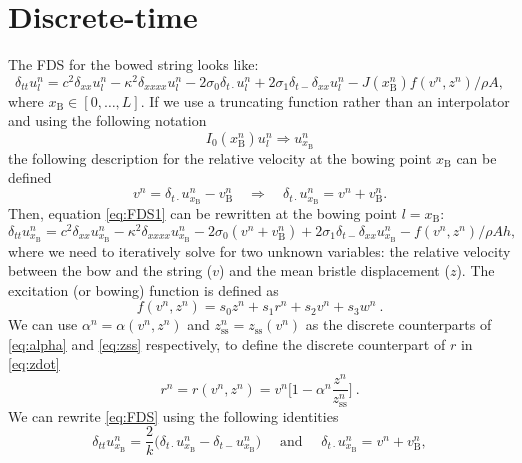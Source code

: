\documentclass{article}
\begin{document}
\section{Discrete-time}
The FDS for the bowed string looks like:
\begin{equation}\label{eq:FDS1}
    \delta_{tt} u_l^n =c^2 \delta_{xx} u_l^n -\kappa^2\delta_{xxxx} u_l^n - 2\sigma_0\delta_{t\cdot} u_l^n
    + 2\sigma_1\delta_{t-}\delta_{xx}u_l^n - J(x_\text{B}^n)f(v^n, z^n)/\rho A,
\end{equation}
where $x_\text{B} \in [0,\hdots, L]$. If we use a truncating function rather than an interpolator and using the following notation
\begin{equation}
    I_0(x_\text{B}^n)u^n_l \Rightarrow u^n_{x_\text{B}}
\end{equation}
the following description for the relative velocity at the bowing point $x_\text{B}$ can be defined
\begin{equation}
    v^n = \delta_{t\cdot}u^n_{x_\text{B}} - v_\text{B}^n \quad \Rightarrow \quad \delta_{t\cdot}u^n_{x_\text{B}} = v^n + v_\text{B}^n.
\end{equation}
Then, equation \eqref{eq:FDS1} can be rewritten at the bowing point $l=x_\text{B}$:
\begin{equation}
\label{eq:FDS}
\delta_{tt} u_{x_\text{B}}^n =c^2 \delta_{xx} u_{x_\text{B}}^n -\kappa^2\delta_{xxxx} u_{x_\text{B}}^n - 2\sigma_0(v^n + v_\text{B}^n)
+ 2\sigma_1\delta_{t-}\delta_{xx}u_{x_\text{B}}^n - f(v^n, z^n)/\rho Ah,
\end{equation}
where we need to iteratively solve for two unknown variables: the relative velocity between the bow and the string ($v$) and the mean bristle displacement ($z$).
The excitation (or bowing) function is defined as
\begin{equation}
    f(v^n, z^n) = s_0z^n + s_1 r^n + s_2v^n + s_3w^n\ .
\end{equation}
We can use $\alpha^n = \alpha(v^n, z^n)$ and $z_\text{ss}^n = z_\text{ss}(v^n)$ as the discrete counterparts of \eqref{eq:alpha} and \eqref{eq:zss} respectively, to define the discrete counterpart of $r$ in \eqref{eq:zdot}
\begin{equation}
    r^n = r(v^n,z^n)= v^n\bigg[1-\alpha^n\frac{z^n}{z_\text{ss}^n}\bigg]\ .
\end{equation}
We can rewrite \eqref{eq:FDS} using the following identities
\begin{equation}
    \delta_{tt}u_{x_\text{B}}^n = \frac{2}{k}\big(\delta_{t\cdot}u_{x_\text{B}}^n-\delta_{t-}u_{x_\text{B}}^n\big) \quad \text{ and } \quad \delta_{t\cdot}u_{x_\text{B}}^n = v^n + v_\text{B}^n,
\end{equation}
\end{document}
